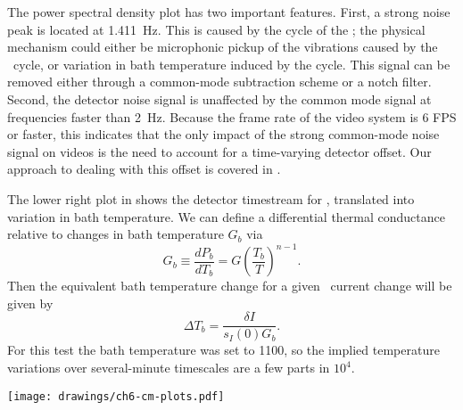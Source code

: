 The power spectral density plot has two important features.
First, a strong noise peak is located at \SI{1.411}{\Hz}.
This is caused by the  cycle of the \PTC; the physical mechanism could either be microphonic pickup of the vibrations caused by the \PTC\ cycle, or variation in bath temperature induced by the cycle.
This signal can be removed either through a common-mode subtraction scheme or a notch filter.
Second, the detector noise signal is unaffected by the common mode signal at frequencies faster than \SI{2}{\Hz}.
Because the frame rate of the video system is 6 FPS or faster, this indicates that the only impact of the strong common-mode noise signal on videos is the need to account for a time-varying detector offset.
Our approach to dealing with this offset is covered in .

The lower right plot in  shows the detector timestream for , translated into variation in bath temperature.
We can define a differential thermal conductance relative to changes in bath temperature $G_b$ via
\begin{equation}
  G_b \equiv \frac{dP_b}{d T_b} = G \left( \frac{T_b}{T} \right)^{n-1}.
\end{equation}
Then the equivalent bath temperature change for a given \TES\ current change will be given by
\begin{equation}
  \Delta T_b = \frac{\delta I}{s_I(0) G_b}.
\end{equation}
For this test the bath temperature was set to \SI{1100}{\mK}, so the implied temperature variations over several-minute timescales are a few parts in $10^{4}$.

\begin{figure*}
\texttt{[image: drawings/ch6-cm-plots.pdf]}
\caption[Plots summarizing common mode signal and $1/f$ noise]{
Plots summarizing common mode signal and $1/f$ noise.
\textbf{Upper Left}
Plot showing raw detector output for 15 detectors over a 10-minute data acquisition.
The data was acquired at \SI{312.5}{\Hz}, but only every 100th data point is plotted.
\textbf{Upper Right} 
The same data after removal of the common mode signal (as defined in the text).
\textbf{Lower Left} 
Current noise power spectral density for the raw data, the raw data minus the common mode (``No CM''), the raw data minus the common mode and the best-fit 4th-order polynomial (``No CM, Poly''), and the common mode itself (``CM'').
The strong noise peak at \SI{1.411}{\Hz} is due to the \PTC, as explained in the text.
\textbf{Lower Right} 
Raw timestream for , after conversion to an equivalent bath temperature variation, as described in the text.
}
\label{fig:ch6-cm-plots}
\end{figure*}

